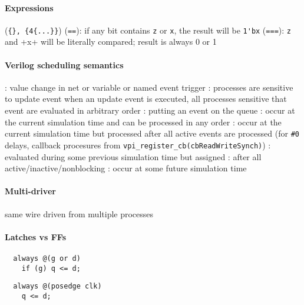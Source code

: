 \documentclass{memo}
\begin{document}
\paragraph{Expressions}
\bit
\w {} (\verb+{}, {4{...}}+)
\w {}
  \bit
  \w {} (\verb+==+): if any bit contains \verb+z+ or
  \verb+x+, the result will be \verb+1'bx+
  \w {} (\verb+===+): \verb+z+ and +x+ will be literally
  compared; result is always 0 or 1
  \eit
\eit

\paragraph{Verilog scheduling semantics}
\bit
\w {}
  \bit
  \w {}: value change in net or variable or named event trigger
  \w {}: processes are sensitive to update event
    \bit
    \w when an update event is executed, all processes sensitive that event
      are evaluated in arbitrary order
    \eit
  \eit
\w {}: putting an event on the queue
\w {}
   \bit
   \w {}: occur at the current simulation time and can be
   processed in any order
   \w {}: occur at the current simulation time but processed
   after all active events are processed (for \verb+#0+ delays, callback
   procesures from \verb+vpi_register_cb(cbReadWriteSynch)+)
   \w {}: evaluated during some previous simulation time
   but assigned 
   \w {}: after all active/inactive/nonblocking
   \w {}: occur at some future simulation time
      \bit
      \w {}
      \w {}
      \eit
   \eit
\eit

\paragraph{Multi-driver}
\bit
\w same wire driven from multiple processes
\eit

\paragraph{Latches vs FFs}
\bit
\w {}
  \begin{verbatim}
  always @(g or d) 
    if (g) q <= d;
  \end{verbatim}
\w {}
  \begin{verbatim}
  always @(posedge clk) 
    q <= d;
  \end{verbatim}
\eit
\end{document}
